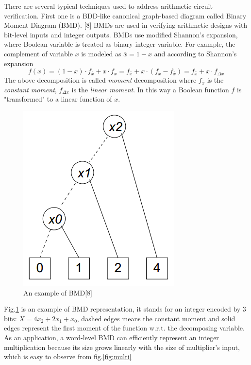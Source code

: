 \documentclass[11pt,twoside, onecolumn]{IEEEtran}
\begin{document}
There are several typical techniques used to address arithmetic circuit verification.
First one is a BDD-like canonical graph-based diagram called Binary Moment Diagram (BMD). [8]
BMDs are used in verifying arithmetic designs with bit-level inputs and integer outputs.
BMDs use modified Shannon's expansion, where Boolean variable is treated as binary integer 
variable. For example, the complement of variable $x$ is modeled as $\bar{x} = 1-x$
and according to Shannon's expansion
$$f(x) = (1-x)\cdot f_{\bar{x}} + x\cdot f_x = f_{\bar{x}} + x\cdot(f_x - f_{\bar{x}}) = f_{\bar{x}} + x\cdot f_{\Delta x}$$
The above decomposition is called \emph{moment} decomposition where $f_{\bar{x}}$ is the 
\emph{constant moment}, $f_{\Delta x}$ is the \emph{linear moment}. In this way a Boolean
function $f$ is "transformed" to a linear function of $x$.
 \begin{figure}[hbt]
	\begin{center}
	\includegraphics[scale=0.4]{BMD.png}
	\end{center}
	\caption{An example of BMD[8]}
	\label{fig:BMD}
\end{figure}
Fig.\ref{fig:BMD} is an example of BMD representation, it stands for an integer encoded
by 3 bits: $X = 4x_2 + 2x_1 + x_0$,
dashed edges means the constant moment and solid edges represent the first moment of the function 
w.r.t. the decomposing variable. As an application, a word-level BMD can efficiently represent an integer multiplication
because its size grows linearly with the size of multiplier's input, which is easy to observe
from fig.\ref{fig:multi} 
\end{document}
